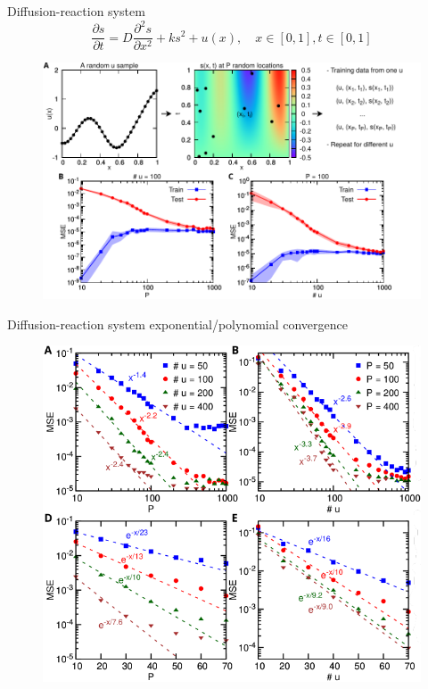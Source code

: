 \documentclass{beamer}
\begin{document}
\begin{frame}{Diffusion-reaction system}
\begin{equation*}
    \frac{\partial s}{\partial t} = D\frac{\partial^2 s}{\partial x^2} + k s^2 + u(x), \quad x \in [0, 1], t \in [0, 1]
\end{equation*}
\begin{figure}
\centering
\includegraphics[width=.85\textwidth]{adr_error.pdf}
\end{figure}
\end{frame}

\begin{frame}{Diffusion-reaction system}
exponential/polynomial convergence
\begin{figure}
\centering
\includegraphics[width=.65\textwidth]{adr_convergence.pdf}
\end{figure}
\end{frame}
\end{document}
